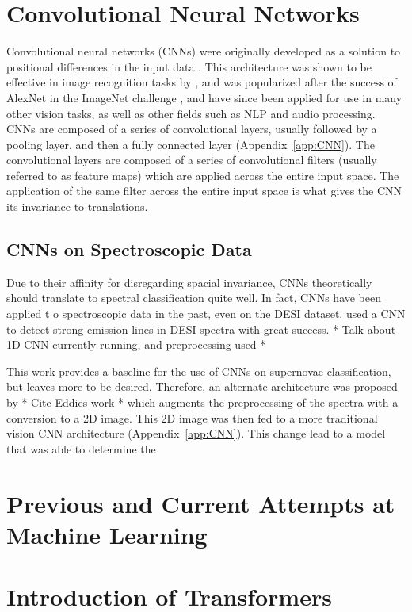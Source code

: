 \section{Convolutional Neural Networks}
\label{sec:CNN}
Convolutional neural networks (CNNs) were originally developed as a solution 
to positional differences in the input data \parencite{fukushima1979}. This architecture 
was shown to be effective in image recognition tasks by \textcite{lecun2004}, and 
was popularized after the success of AlexNet in the 
ImageNet challenge \textcite{krizhevsky2012}, and have since been applied for use in 
many other vision tasks, as well as other fields such as NLP and audio processing. 
CNNs are composed of a series of convolutional layers, usually followed by a 
pooling layer, and then a fully connected layer (Appendix~\ref{app:CNN}). The convolutional layers are 
composed of a series of convolutional filters (usually referred to as feature maps)
which are applied across the entire input space. The application of the same filter 
across the entire input space is what gives the CNN its invariance to translations.

\subsection{CNNs on Spectroscopic Data}
\label{sec:CNNspectra}
Due to their affinity for disregarding spacial invariance, CNNs theoretically should 
translate to spectral classification quite well. In fact, CNNs have been applied t
o spectroscopic data in the past, even on the DESI dataset. 
\textcite{parks2018} used a CNN to detect strong emission lines in DESI spectra with 
great success. * Talk about 1D CNN currently running, and preprocessing used *

This work provides a baseline for the use of CNNs on supernovae classification, 
but leaves more to be desired. Therefore, an alternate architecture was proposed 
by * Cite Eddies work * which augments the preprocessing of the spectra with 
a conversion to a 2D image. This 2D image was then fed to a more traditional vision 
CNN architecture (Appendix~\ref{app:CNN}). This change lead to a model that was 
able to determine the 
\section{Previous and Current Attempts at Machine Learning}
\label{sec:previousML}

\section{Introduction of Transformers}
\label{sec:transformers}

